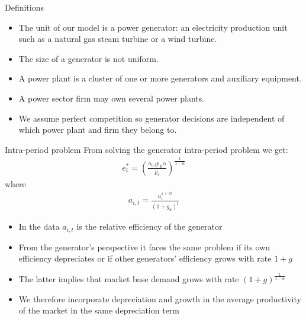 \documentclass{beamer}
\begin{document}
\begin{frame}{Definitions}\label{definitions}

\begin{itemize}
 \item The unit of our model is a power generator: an electricity production unit such as a natural gas steam turbine or a wind turbine.
 \item The size of a generator is not uniform.
 \item A power plant is a cluster of one or more generators and auxiliary equipment.
 \item A power sector firm may own several power plants.
 \item We assume perfect competition so generator decisions are independent of which power plant and firm they belong to.
\end{itemize}
\hyperlink{model_struct}{}   
    
\end{frame}
\begin{frame}{Intra-period problem}\label{intra_period}
\small
    From solving the generator intra-period problem we get:\\
    \begin{align*}
        e_i^* = (\frac{a_{i,t}p_E\alpha}{p_e})^\frac{1}{1-\alpha}
    \end{align*}
    where \begin{align*}
        a_{i,t}=\frac{a_{i}^{1+\gamma t}}{(1+g_a)^t}
    \end{align*}
    \begin{itemize} 
        \item In the data $a_{i,t}$ is the relative efficiency of the generator
        \item From the generator's perspective it faces the same problem if its own efficiency depreciates or if other generators' efficiency grows with rate $1+g$  
        \item The latter implies that market base demand grows with rate $(1+g)^\frac{1}{1-\alpha}$
        \item We therefore incorporate depreciation and growth in the average productivity of the market in the same depreciation term
    \end{itemize}
    
 \hyperlink{gen_problem}{}    
\end{frame}

\end{document}
